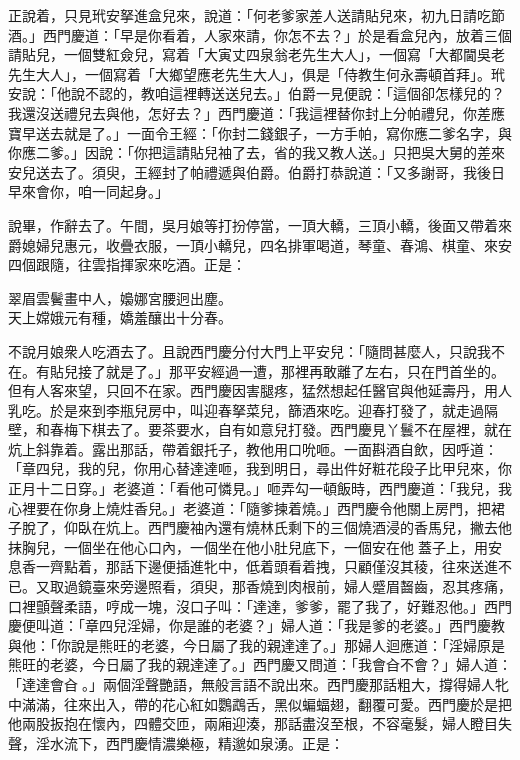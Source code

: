 正說着，只見玳安拏進盒兒來，說道：「何老爹家差人送請貼兒來，初九日請吃節酒。」西門慶道：「早是你看着，人家來請，你怎不去？」於是看盒兒內，放着三個請貼兒，一個雙紅僉兒，寫着「大寅丈四泉翁老先生大人」，一個寫「大都閫吳老先生大人」，一個寫着「大鄉望應老先生大人」，俱是「侍教生何永壽頓首拜」。玳安說：「他說不認的，教咱這裡轉送送兒去。」伯爵一見便說：「這個卻怎樣兒的？我還沒送禮兒去與他，怎好去？」西門慶道：「我這裡替你封上分帕禮兒，你差應寶早送去就是了。」一面令王經：「你封二錢銀子，一方手帕，寫你應二爹名字，與你應二爹。」因說：「你把這請貼兒袖了去，省的我又教人送。」只把吳大舅的差來安兒送去了。須臾，王經封了帕禮遞與伯爵。伯爵打恭說道：「又多謝哥，我後日早來會你，咱一同起身。」

說畢，作辭去了。午間，吳月娘等打扮停當，一頂大轎，三頂小轎，後面又帶着來爵媳婦兒惠元，收疊衣服，一頂小轎兒，四名排軍喝道，琴童、春鴻、棋童、來安四個跟隨，往雲指揮家來吃酒。正是：

\begin{myquote}
翠眉雲鬢畫中人，嬝娜宮腰迥出塵。\\天上嫦娥元有種，嬌羞釀出十分春。
\end{myquote}

不說月娘衆人吃酒去了。且說西門慶分付大門上平安兒：「隨問甚麼人，只說我不在。有貼兒接了就是了。」那平安經過一遭，那裡再敢離了左右，只在門首坐的。但有人客來望，只回不在家。西門慶因害腿疼，猛然想起任醫官與他延壽丹，用人乳吃。{}於是來到李瓶兒房中，叫迎春拏菜兒，篩酒來吃。迎春打發了，就走過隔壁，和春梅下棋去了。要茶要水，自有如意兒打發。西門慶見丫鬟不在屋裡，就在炕上斜靠着。露出那話，帶着銀托子，教他用口吮咂。一面斟酒自飲，因呼道：「章四兒，我的兒，你用心替達達咂，我到明日，尋出件好粧花段子比甲兒來，你正月十二日穿。」老婆道：「看他可憐見。」咂弄勾一頓飯時，西門慶道：「我兒，我心裡要在你身上燒炷香兒。」老婆道：「隨爹揀着燒。」西門慶令他關上房門，把裙子脫了，仰臥在炕上。西門慶袖內還有燒林氏剩下的三個燒酒浸的香馬兒，撇去他抹胸兒，一個坐在他心口內，一個坐在他小肚兒底下，一個安在他𣭈蓋子上，用安息香一齊點着，那話下邊便插進牝中，低着頭看着拽，只顧僅沒其稜，往來送進不已。又取過鏡臺來旁邊照看，{}須臾，那香燒到肉根前，婦人蹙眉齧齒，忍其疼痛，口裡顫聲柔語，哼成一塊，沒口子叫：「達達，爹爹，罷了我了，好難忍他。」西門慶便叫道：「章四兒淫婦，你是誰的老婆？」婦人道：「我是爹的老婆。」西門慶教與他：「你說是熊旺的老婆，今日屬了我的親達達了。」{}那婦人迴應道：「淫婦原是熊旺的老婆，今日屬了我的親達達了。」西門慶又問道：「我會㒲不會？」婦人道：「達達會㒲𣭈。」兩個淫聲艷語，無般言語不說出來。西門慶那話粗大，撐得婦人牝中滿滿，往來出入，帶的花心紅如鸚鵡舌，黑似蝙蝠翅，翻覆可愛。西門慶於是把他兩股扳抱在懷內，四體交匝，兩廂迎湊，那話盡沒至根，不容毫髮，婦人瞪目失聲，淫水流下，西門慶情濃樂極，精邈如泉湧。正是：

